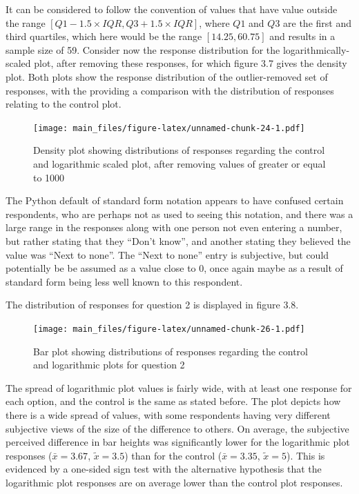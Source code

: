 \documentclass[
  11pt,
]{book}
\begin{document}
It can be considered to follow the convention of values that have value
outside the range \([Q1 - 1.5 \times IQR, Q3 + 1.5 \times IQR]\), where
\(Q1\) and \(Q3\) are the first and third quartiles, which here would be
the range \([14.25, 60.75]\) and results in a sample size of 59.
Consider now the response distribution for the logarithmically-scaled
plot, after removing these responses, for which figure 3.7 gives the
density plot. Both plots show the response distribution of the
outlier-removed set of responses, with the providing a comparison with
the distribution of responses relating to the control plot.

\begin{figure}
\centering
\texttt{[image: main\_files/figure-latex/unnamed-chunk-24-1.pdf]}
\caption{Density plot showing distributions of responses regarding the
control and logarithmic scaled plot, after removing values of greater or
equal to 1000}
\end{figure}

The Python default of standard form notation appears to have confused
certain respondents, who are perhaps not as used to seeing this
notation, and there was a large range in the responses along with one
person not even entering a number, but rather stating that they ``Don't
know'', and another stating they believed the value was ``Next to
none''. The ``Next to none'' entry is subjective, but could potentially
be be assumed as a value close to 0, once again maybe as a result of
standard form being less well known to this respondent.

The distribution of responses for question 2 is displayed in figure 3.8.

\begin{figure}
\centering
\texttt{[image: main\_files/figure-latex/unnamed-chunk-26-1.pdf]}
\caption{Bar plot showing distributions of responses regarding the
control and logarithmic plots for question 2}
\end{figure}

The spread of logarithmic plot values is fairly wide, with at least one
response for each option, and the control is the same as stated before.
The plot depicts how there is a wide spread of values, with some
respondents having very different subjective views of the size of the
difference to others. On average, the subjective perceived difference in
bar heights was significantly lower for the logarithmic plot responses
(\(\bar{x}=3.67\), \(\tilde{x}=3.5\)) than for the control
(\(\bar{x}=3.35\), \(\tilde{x}=5\)). This is evidenced by a one-sided
sign test with the alternative hypothesis that the logarithmic plot
responses are on average lower than the control plot responses.
\end{document}
